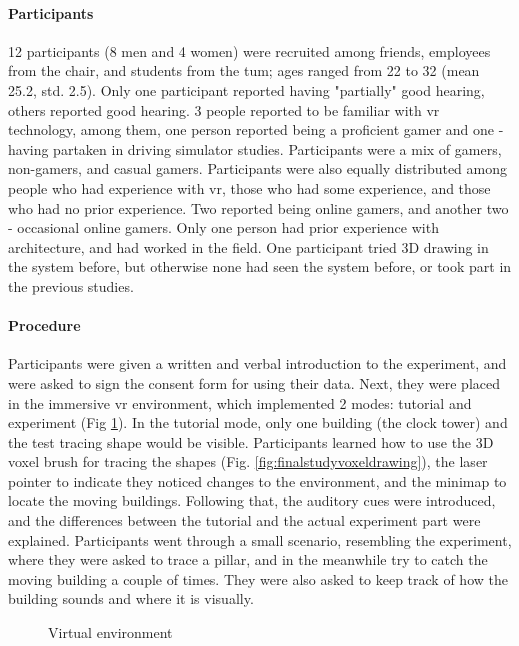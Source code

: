 \paragraph{Participants}
12 participants (8 men and 4 women) were recruited among friends, employees from the chair, and students from the \gls{tum}; ages ranged from 22 to 32 (mean 25.2, std. 2.5). Only one participant reported having "partially" good hearing, others reported good hearing. 3 people reported to be familiar with \gls{vr} technology, among them, one person reported being a proficient gamer and one - having partaken in driving simulator studies. Participants were a mix of gamers, non-gamers, and casual gamers. Participants were also equally distributed among people who had experience with \gls{vr}, those who had some experience, and those who had no prior experience. Two reported being online gamers, and another two - occasional online gamers. Only one person had prior experience with architecture, and had worked in the field. One participant tried 3D drawing in the system before, but otherwise none had seen the system before, or took part in the previous studies.

\paragraph{Procedure}
Participants were given a written and verbal introduction to the experiment,
and were asked to sign the consent form for using their data.
Next, they were placed in the immersive \gls{vr} environment, which implemented 2 modes: tutorial and experiment (Fig \ref{fig:finalstudy_immersive_vr_environment}). In the tutorial mode, only one building (the clock tower) and the test tracing shape would be visible.
Participants learned how to use the 3D voxel brush for tracing the shapes (Fig. \ref{fig:finalstudyvoxeldrawing}), the laser pointer to indicate they noticed changes to the environment, and the minimap to locate the moving buildings. Following that, the auditory cues were introduced, and the differences between the tutorial and the actual experiment part were explained. Participants went through a small scenario, resembling the experiment, where they were asked to trace a pillar, and in the meanwhile try to catch the moving building a couple of times. They were also asked to keep track of how the building sounds and where it is visually.

\begin{figure}
	\centering
	
	\par
	\par
	
	\caption{Virtual environment}
	\label{fig:finalstudy_immersive_vr_environment}
\end{figure}


